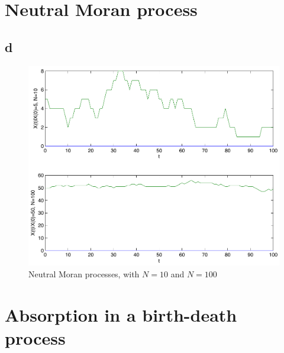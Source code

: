 \setcounter{chapter}{4}
\setcounter{section}{0}
\section{Neutral Moran process}

\subsection{d}

\begin{figure}[htbp]
\centering
\includegraphics[scale=0.7]{./images/plot_moran}
\caption{Neutral Moran processes, with $N=10$ and $N=100$}
\label{fig:graph03}
\end{figure}




\setcounter{chapter}{5}
\setcounter{section}{0}
\section{Absorption in a birth-death process}


